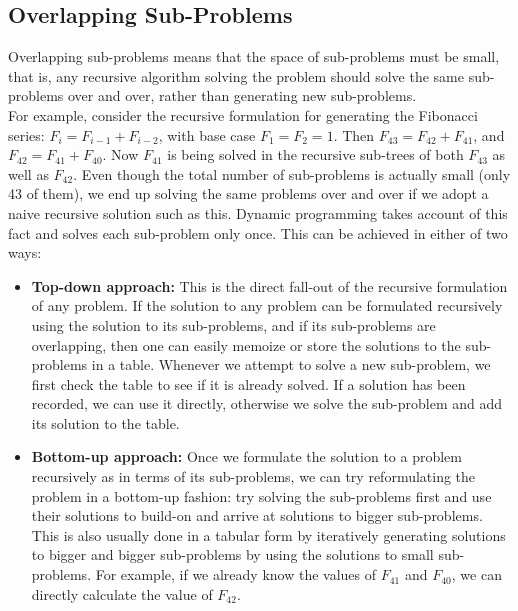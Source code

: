 \documentclass{report}
\begin{document}
    \subsection{Overlapping Sub-Problems}
    \bigskip
    Overlapping sub-problems means that the space of sub-problems must be small, that is, any recursive algorithm solving the problem should solve the same sub-problems over and over, rather than generating new sub-problems.\\
    For example, consider the recursive formulation for generating the Fibonacci series: $F_i = F_{i{-}1} + F_{i{-}2}$, with base case $F_1 = F_2 = 1$. Then $F_{43} = F_{42} + F_{41}$, and $F_{42} = F_{41} + F_{40}$. Now $F_{41}$ is being solved in the recursive sub-trees of both $F_{43}$ as well as $F_{42}$. Even though the total number of sub-problems is actually small (only 43 of them), we end up solving the same problems over and over if we adopt a naive recursive solution such as this. Dynamic programming takes account of this fact and solves each sub-problem only once.
    This can be achieved in either of two ways:
    \bigskip
    \begin{itemize}
        \item {\textbf{Top-down approach:}} This is the direct fall-out of the recursive formulation of any problem. If the solution to any problem can be formulated recursively using the solution to its sub-problems, and if its sub-problems are overlapping, then one can easily memoize or store the solutions to the sub-problems in a table. Whenever we attempt to solve a new sub-problem, we first check the table to see if it is already solved. If a solution has been recorded, we can use it directly, otherwise we solve the sub-problem and add its solution to the table. 
        \bigskip
        \item {\textbf{Bottom-up approach:}} Once we formulate the solution to a problem recursively as in terms of its sub-problems, we can try reformulating the problem in a bottom-up fashion: try solving the sub-problems first and use their solutions to build-on and arrive at solutions to bigger sub-problems. This is also usually done in a tabular form by iteratively generating solutions to bigger and bigger sub-problems by using the solutions to small sub-problems. For example, if we already know the values of $F_{41}$ and $F_{40}$, we can directly calculate the value of $F_{42}$.
    \end{itemize}
    
    \newpage
    
\end{document}
